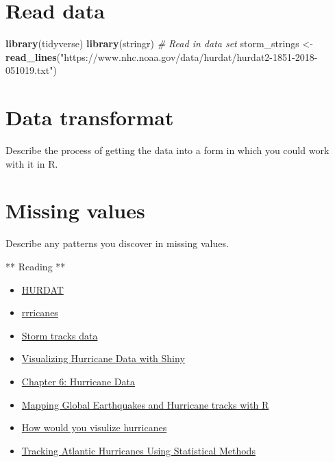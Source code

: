 \documentclass[]{book}
\newenvironment{Shaded}{\begin{snugshade}}{\end{snugshade}}
\newcommand{\CommentTok}[1]{\textcolor[rgb]{0.56,0.35,0.01}{\textit{#1}}}
\newcommand{\KeywordTok}[1]{\textcolor[rgb]{0.13,0.29,0.53}{\textbf{#1}}}
\newcommand{\NormalTok}[1]{#1}
\newcommand{\StringTok}[1]{\textcolor[rgb]{0.31,0.60,0.02}{#1}}
\providecommand{\tightlist}{%
  \setlength{\itemsep}{0pt}\setlength{\parskip}{0pt}}
\begin{document}
\hypertarget{read-data}{%
\section{Read data}\label{read-data}}

\begin{Shaded}
\begin{Highlighting}[]
\KeywordTok{library}\NormalTok{(tidyverse)}
\KeywordTok{library}\NormalTok{(stringr)}
\CommentTok{# Read in data set}
\NormalTok{storm_strings <-}\StringTok{ }\KeywordTok{read_lines}\NormalTok{(}\StringTok{"https://www.nhc.noaa.gov/data/hurdat/hurdat2-1851-2018-051019.txt"}\NormalTok{)}
\end{Highlighting}
\end{Shaded}

\hypertarget{data-transformat}{%
\section{Data transformat}\label{data-transformat}}

Describe the process of getting the data into a form in which you could work with it in R.

\hypertarget{missing-values}{%
\section{Missing values}\label{missing-values}}

Describe any patterns you discover in missing values.

** Reading **

\begin{itemize}
\tightlist
\item
  \href{\%22https://cran.r-project.org/web/packages/HURDAT/HURDAT.pdf}{HURDAT}
\item
  \href{\%22https://github.com/ropensci/rrricanes\%22}{rrricanes}
\item
  \href{\%22https://dplyr.tidyverse.org/reference/storms.html\%22}{Storm tracks data}
\item
  \href{\%22https://www.r-bloggers.com/visualizing-hurricane-data-with-shiny/\%22}{Visualizing Hurricane Data with Shiny}
\item
  \href{\%22https://rpubs.com/jelsner/4826\%22}{Chapter 6: Hurricane Data}
\item
  \href{\%22http://david-lallemant.com/mapping-global-earthquakes-and-hurricane-tracks-with-r-2/\%22}{Mapping Global Earthquakes and Hurricane tracks with R}
\item
  \href{\%22http://www.storytellingwithdata.com/blog/2017/10/1/how-youd-visualize-hurricanes\%22}{How would you visulize hurricanes}
\item
  \href{\%22https://scholarcommons.usf.edu/cgi/viewcontent.cgi?article=5927\&context=etd\%22}{Tracking Atlantic Hurricanes Using Statistical Methods}
\end{itemize}
\end{document}
